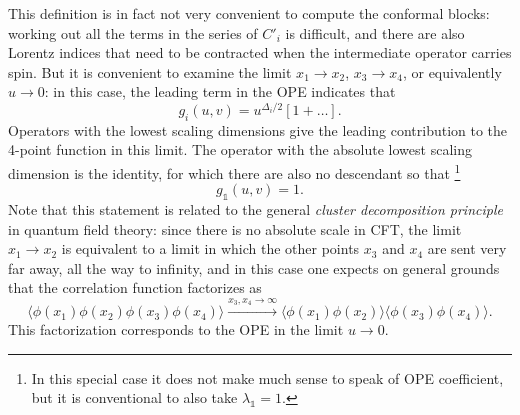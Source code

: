 \documentclass[a4paper,12pt]{article}
\numberwithin{equation}{section}
\begin{document}
This definition is in fact not very convenient to compute the conformal blocks: working out all the terms in the series of $C'_i$ is difficult, and there are also Lorentz indices that need to be contracted when the intermediate operator carries spin. But it is convenient to examine the limit $x_1 \to x_2$, $x_3 \to x_4$, or equivalently $u \to 0$: in this case, the leading term in the OPE indicates that 
\begin{equation}
	g_i(u, v) = u^{\Delta_i/2} \left[ 1 + \ldots \right].
	\label{eq:conformalblocks:leadingterm}
\end{equation}
Operators with the lowest scaling dimensions give the leading contribution to the 4-point function in this limit. 
The operator with the absolute lowest scaling dimension is the identity, for which there are also no descendant so that%
%
\footnote{In this special case it does not make much sense to speak of OPE coefficient, but it is conventional to also take $\lambda_\mathds{1} = 1$.}
%
\begin{equation}
	g_\mathds{1}(u,v) = 1.
\end{equation}
Note that this statement is related to the general \emph{cluster decomposition principle} in quantum field theory: since there is no absolute scale in CFT, the limit $x_1 \to x_2$ is equivalent to a limit in which the other points $x_3$ and $x_4$ are sent very far away, all the way to infinity, and in this case one expects on general grounds that the correlation function factorizes as
\begin{equation}
	\langle \phi(x_1) \phi(x_2) \phi(x_3) \phi(x_4) \rangle
	\xrightarrow{x_3, x_4 \to \infty}
	\langle \phi(x_1) \phi(x_2) \rangle
	\langle \phi(x_3) \phi(x_4) \rangle.
\end{equation}
This factorization corresponds to the OPE in the limit $u \to 0$.
\end{document}

